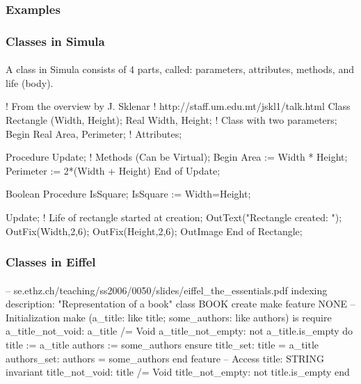 \subsubsection{Examples}

\begin{frame}[fragile]
\frametitle{Classes in Simula}
\framesubtitle{}
A class in Simula consists of 4 parts, called:
parameters, attributes, methods,
and  life (body). 
\bigskip

\begin{cplus3}
! From the overview by J. Sklenar
! http://staff.um.edu.mt/jskl1/talk.html
Class Rectangle (Width, Height); Real Width, Height;
                           ! Class with two parameters;
 Begin
    Real Area, Perimeter;  ! Attributes;

    Procedure Update;      ! Methods (Can be Virtual);
    Begin
      Area := Width * Height;
      Perimeter := 2*(Width + Height)
    End of Update;

    Boolean Procedure IsSquare;
      IsSquare := Width=Height;

    Update;                ! Life of rectangle started at creation;
    OutText("Rectangle created: "); OutFix(Width,2,6);
    OutFix(Height,2,6); OutImage
 End of Rectangle;
\end{cplus3}
\end{frame}

\begin{frame}[fragile]
\frametitle{Classes in  Eiffel}
\framesubtitle{}
\begin{eiffel}
-- se.ethz.ch/teaching/ss2006/0050/slides/eiffel_the_essentials.pdf
indexing 
     description: "Representation of a book" 
class 
     BOOK 
create 
     make 
feature {NONE} -- Initialization 
     make (a_title: like title; some_authors: like authors) is 
          require 
                a_title_not_void: a_title /= Void 
                a_title_not_empty: not a_title.is_empty 
          do 
                title := a_title 
                authors := some_authors 
          ensure 
               title_set: title = a_title 
               authors_set: authors = some_authors 
          end 
feature -- Access 
     title: STRING 
invariant 
     title_not_void: title /= Void 
     title_not_empty: not title.is_empty 
end
\end{eiffel}
\end{frame}


